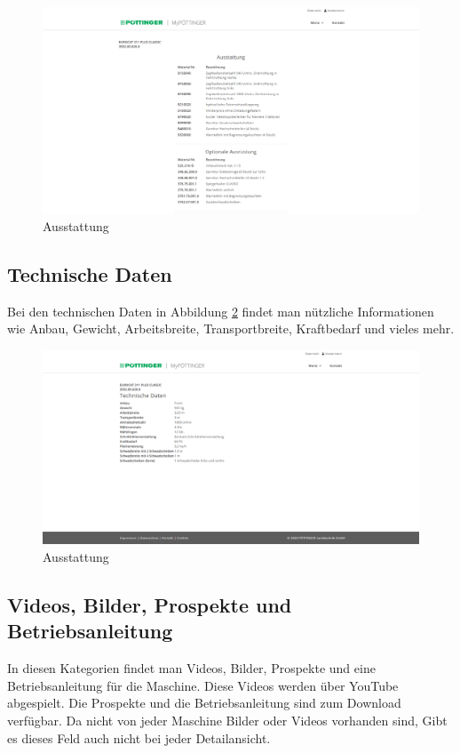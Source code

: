 \begin{figure}[H]
	\centerline{
		\includegraphics[width=1\textwidth, frame]{./grafiken/erm_detailansicht_ausstattung.PNG}
	}
	\vskip0pt
	\caption{Ausstattung} \label{fig:ausstattung}
\end{figure}

\subsection{Technische Daten}

Bei den technischen Daten in Abbildung \ref{fig:technischeDaten} findet man nützliche Informationen wie Anbau, Gewicht, Arbeitsbreite, Transportbreite, Kraftbedarf und vieles mehr.

\begin{figure}[H]
	\centerline{
		\includegraphics[width=1\textwidth, frame]{./grafiken/erm_detailansicht_technisch.PNG}
	}
	\vskip0pt
	\caption{Ausstattung} \label{fig:technischeDaten}
\end{figure}
\subsection{Videos, Bilder, Prospekte und Betriebsanleitung}
In diesen Kategorien findet man Videos, Bilder, Prospekte und eine Betriebsanleitung für die Maschine. Diese Videos werden über YouTube abgespielt. Die Prospekte und die Betriebsanleitung sind zum Download verfügbar. Da nicht von jeder Maschine Bilder oder Videos vorhanden sind, Gibt es dieses Feld auch nicht bei jeder Detailansicht.

